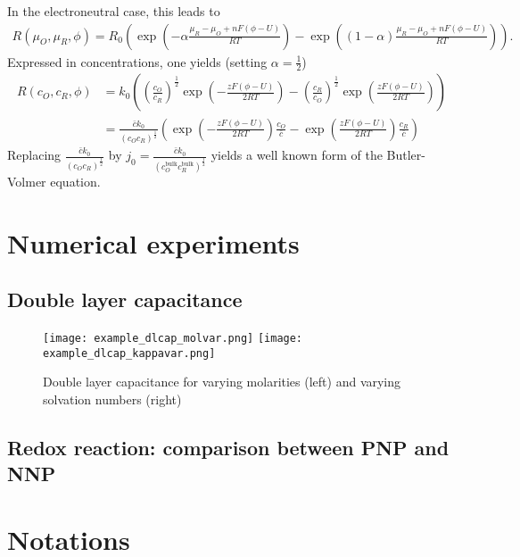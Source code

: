 \documentclass[12pt,oneside,reqno]{amsart}
\numberwithin{equation}{section}
\begin{document}
In the electroneutral case, this leads to 
\begin{align}\label{eq:MBVneux}
  R(\mu_O,\mu_R,\phi)= R_0\left(\exp\left(-\alpha\frac{\mu_R-\mu_O+nF(\phi-U)}{RT}\right)-\exp\left((1-\alpha)\frac{\mu_R-\mu_O+nF(\phi-U)}{RT}\right)\right).
\end{align}
Expressed in concentrations, one yields (setting $\alpha=\frac12$)
\begin{align}
  R(c_O,c_R,\phi)&= k_0\left( \left(\frac{c_O}{c_R}\right)^{\frac12}\exp\left(-\frac{zF(\phi-U)}{2RT}\right)-\left(\frac{c_R}{c_O}\right)^{\frac12}\exp\left(\frac{zF(\phi-U)}{2RT}\right)\right)\\
                 &= \frac{\bar ck_0}{(c_Oc_R)^{\frac12}}\left(\exp\left(-\frac{zF(\phi-U)}{2RT}\right)\frac{c_O}{\bar c}-\exp\left(\frac{zF(\phi-U)}{2RT}\right)\frac{c_R}{\bar c}\right)
\label{eq:MBVohm}
\end{align}
Replacing $\frac{\bar ck_0}{(c_Oc_R)^{\frac12}}$ by $j_0=\frac{\bar ck_0}{(c_O^\text{bulk}c_R^\text{bulk})^{\frac12}}$
yields a well known form of the Butler-Volmer equation.


\section{Numerical experiments}

\subsection{Double layer capacitance}

\begin{figure}
  \begin{center}
  \texttt{[image: example\_dlcap\_molvar.png]}
  \texttt{[image: example\_dlcap\_kappavar.png]}
\end{center}
\caption{Double layer capacitance for varying molarities (left) and varying solvation numbers (right)}
\end{figure}

\subsection{Redox reaction: comparison between PNP and NNP}



\clearpage




\appendix
\section{Notations}
\end{document}

